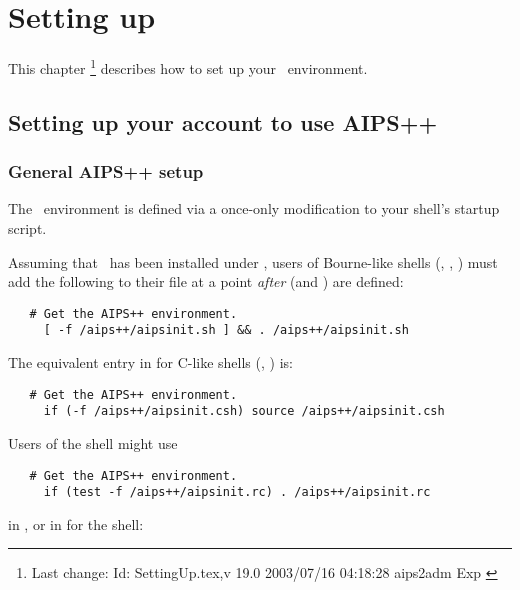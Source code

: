 \chapter{Setting up}
\label{Setting up}

This chapter \footnote{Last change:
$ $Id: SettingUp.tex,v 19.0 2003/07/16 04:18:28 aips2adm Exp $ $}
describes how to set up your \aipspp\ environment.


\section{Setting up your account to use AIPS++}
\label{Setup}

\subsection{General AIPS++ setup}

The \aipspp\ environment is defined via a once-only modification to your
shell's startup script.

Assuming that \aipspp\ has been installed under , users of
Bourne-like shells (, , ) must add the
following to their  file at a point {\em after} 
(and ) are defined:

\begin{verbatim}
   # Get the AIPS++ environment.
     [ -f /aips++/aipsinit.sh ] && . /aips++/aipsinit.sh
\end{verbatim}

\noindent
The equivalent entry in  for C-like shells (,
) is:

\begin{verbatim}
   # Get the AIPS++ environment.
     if (-f /aips++/aipsinit.csh) source /aips++/aipsinit.csh
\end{verbatim}

\noindent
Users of the  shell might use

\begin{verbatim}
   # Get the AIPS++ environment.
     if (test -f /aips++/aipsinit.rc) . /aips++/aipsinit.rc
\end{verbatim}

\noindent
in , or in  for the  shell:

